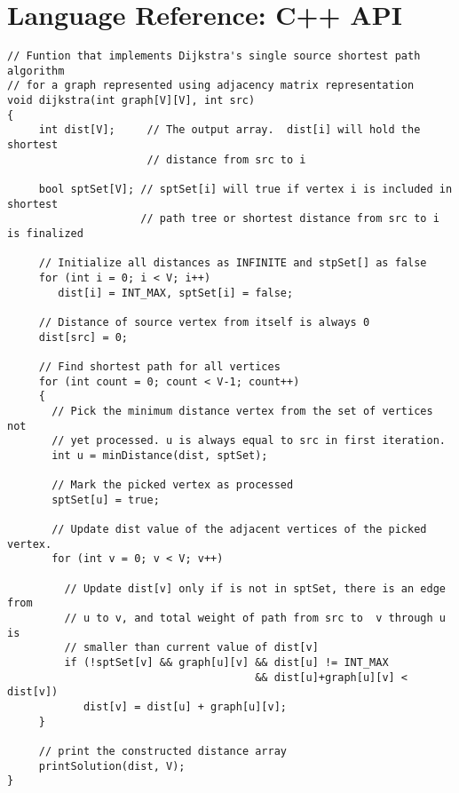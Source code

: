 \documentclass[
a4paper, %
11pt, %
onecolumn, %
openany, %
]{memoir}
\begin{document}
\chapter{Language Reference: C++ API}
\begin{verbatim}
// Funtion that implements Dijkstra's single source shortest path algorithm
// for a graph represented using adjacency matrix representation
void dijkstra(int graph[V][V], int src)
{
     int dist[V];     // The output array.  dist[i] will hold the shortest
                      // distance from src to i
  
     bool sptSet[V]; // sptSet[i] will true if vertex i is included in shortest
                     // path tree or shortest distance from src to i is finalized
  
     // Initialize all distances as INFINITE and stpSet[] as false
     for (int i = 0; i < V; i++)
        dist[i] = INT_MAX, sptSet[i] = false;
  
     // Distance of source vertex from itself is always 0
     dist[src] = 0;
  
     // Find shortest path for all vertices
     for (int count = 0; count < V-1; count++)
     {
       // Pick the minimum distance vertex from the set of vertices not
       // yet processed. u is always equal to src in first iteration.
       int u = minDistance(dist, sptSet);
  
       // Mark the picked vertex as processed
       sptSet[u] = true;
  
       // Update dist value of the adjacent vertices of the picked vertex.
       for (int v = 0; v < V; v++)
  
         // Update dist[v] only if is not in sptSet, there is an edge from 
         // u to v, and total weight of path from src to  v through u is 
         // smaller than current value of dist[v]
         if (!sptSet[v] && graph[u][v] && dist[u] != INT_MAX 
                                       && dist[u]+graph[u][v] < dist[v])
            dist[v] = dist[u] + graph[u][v];
     }
  
     // print the constructed distance array
     printSolution(dist, V);
}
\end{verbatim}
\end{document}
